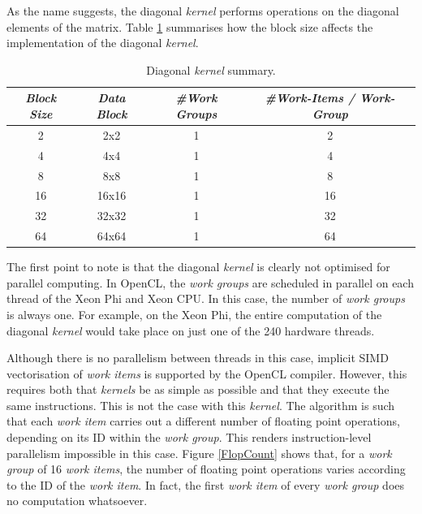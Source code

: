 \par{As the name suggests, the diagonal \emph{kernel} performs operations on the 
    diagonal elements of the matrix. Table \ref{tab:lu1} summarises how the block 
    size affects the implementation of the diagonal \emph{kernel}.}

\begin{table}[!h]
    \centering
    \begin{tabular}{| c | c | c | c |}
    \hline
    \emph{Block Size} & \emph{Data Block} & \emph{\#Work Groups} & 
                    \emph{\#Work-Items / Work-Group} \\ \hline
    2 & 2x2 & 1 & 2 \\ \hline
    4 & 4x4 & 1 & 4 \\ \hline
    8 & 8x8 & 1 & 8 \\ \hline
    16 & 16x16 & 1 & 16 \\ \hline
    32 & 32x32 & 1 & 32 \\ \hline
    64 & 64x64 & 1 & 64\\ \hline
    \end{tabular}
    \caption{Diagonal \emph{kernel} summary.}
    \label{tab:lu1}
\end{table}

\par{The first point to note is that the diagonal \emph{kernel} is clearly not 
    optimised for parallel computing. In OpenCL, the \emph{work groups} are scheduled 
    in parallel on each thread of the Xeon Phi and Xeon CPU. In this case, 
    the number of \emph{work groups} is always one. For example, on the Xeon Phi, 
    the entire computation of the diagonal \emph{kernel} would take place on just one 
    of the 240 hardware threads.}

\par{Although there is no parallelism between threads in this case, 
    implicit SIMD vectorisation of \emph{work items} is supported by the OpenCL 
    compiler. However, this requires both that \emph{kernels} be as simple as possible 
    and that they execute the same instructions. This is not the case with this 
    \emph{kernel}. The algorithm is such that each \emph{work item} carries out a different
    number of floating point operations, depending on its ID within the 
    \emph{work group}. This renders instruction-level parallelism impossible in this 
    case. Figure \ref{FlopCount} shows that, for a \emph{work group} of 16 \emph{work items}, 
    the number of floating point operations varies according to the ID of the 
    \emph{work item}. In fact, the first \emph{work item} of every \emph{work group} does no 
    computation whatsoever.}

